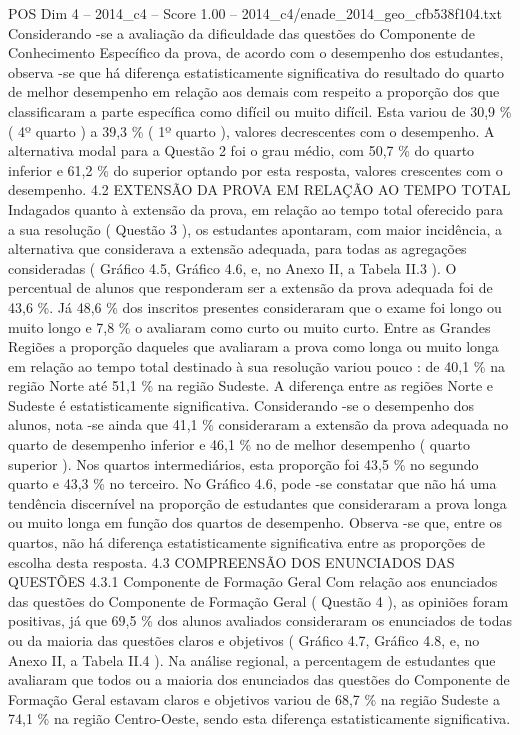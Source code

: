 \begin{textsample}{POS Dim 4 – 2014\_c4 – Score 1.00 – 2014\_c4/enade\_2014\_geo\_cfb538f104.txt}
Considerando -se a avaliação da dificuldade das questões do Componente de Conhecimento Específico da prova, de acordo com o desempenho dos estudantes, observa -se que há diferença estatisticamente significativa do resultado do quarto de melhor desempenho em relação aos demais com respeito a proporção dos que classificaram a parte específica como difícil ou muito difícil.
Esta variou de 30,9 \% ( 4º quarto ) a 39,3 \% ( 1º quarto ), valores decrescentes com o desempenho.
A alternativa modal para a Questão 2 foi o grau médio, com 50,7 \% do quarto inferior e 61,2 \% do superior optando por esta resposta, valores crescentes com o desempenho. 4.2 EXTENSÃO DA PROVA EM RELAÇÃO AO TEMPO TOTAL Indagados quanto à extensão da prova, em relação ao tempo total oferecido para a sua resolução ( Questão 3 ), os estudantes apontaram, com maior incidência, a alternativa que considerava a extensão adequada, para todas as agregações consideradas ( Gráfico 4.5, Gráfico 4.6, e, no Anexo II, a Tabela II.3 ).
O percentual de alunos que responderam ser a extensão da prova adequada foi de 43,6 \%.
Já 48,6 \% dos inscritos presentes consideraram que o exame foi longo ou muito longo e 7,8 \% o avaliaram como curto ou muito curto.
Entre as Grandes Regiões a proporção daqueles que avaliaram a prova como longa ou muito longa em relação ao tempo total destinado à sua resolução variou pouco : de 40,1 \% na região Norte até 51,1 \% na região Sudeste.
A diferença entre as regiões Norte e Sudeste é estatisticamente significativa.
Considerando -se o desempenho dos alunos, nota -se ainda que 41,1 \% consideraram a extensão da prova adequada no quarto de desempenho inferior e 46,1 \% no de melhor desempenho ( quarto superior ).
Nos quartos intermediários, esta proporção foi 43,5 \% no segundo quarto e 43,3 \% no terceiro.
No Gráfico 4.6, pode -se constatar que não há uma tendência discernível na proporção de estudantes que consideraram a prova longa ou muito longa em função dos quartos de desempenho.
Observa -se que, entre os quartos, não há diferença estatisticamente significativa entre as proporções de escolha desta resposta. 4.3 COMPREENSÃO DOS ENUNCIADOS DAS QUESTÕES 4.3.1 Componente de Formação Geral Com relação aos enunciados das questões do Componente de Formação Geral ( Questão 4 ), as opiniões foram positivas, já que 69,5 \% dos alunos avaliados consideraram os enunciados de todas ou da maioria das questões claros e objetivos ( Gráfico 4.7, Gráfico 4.8, e, no Anexo II, a Tabela II.4 ).
Na análise regional, a percentagem de estudantes que avaliaram que todos ou a maioria dos enunciados das questões do Componente de Formação Geral estavam claros e objetivos variou de 68,7 \% na região Sudeste a 74,1 \% na região Centro-Oeste, sendo esta diferença estatisticamente significativa.

\end{textsample}
